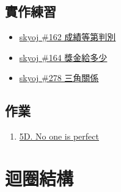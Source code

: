\documentclass[a4paper,12pt]{article}
\begin{document}
\subsection{實作練習}
\label{sec:orge91afc1}
\begin{itemize}
\item \href{http://skyoj.tnfsh.tn.edu.tw/sky/index.php/problem/view/162/}{skyoj \#162 成績等第判別}\\
\item \href{http://skyoj.tnfsh.tn.edu.tw/sky/index.php/problem/view/164/}{skyoj \#164 獎金給多少}\\
\item \href{http://skyoj.tnfsh.tn.edu.tw/sky/index.php/problem/view/278/}{skyoj \#278 三角關係}\\
\end{itemize}

\subsection{作業}
\label{sec:org79838c3}
\begin{enumerate}
\item \href{https://moodle.tnfsh.tn.edu.tw/mod/vpl/view.php?id=1870}{5D. No one is perfect}
\label{sec:org53dbecb}
\end{enumerate}

\section{迴圈結構}
\label{py-for-loop}
\end{document}
